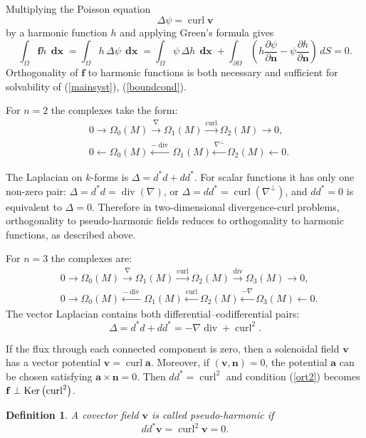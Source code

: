 \documentclass[a4paper]{article}
\newcommand{\Ker}{{\rm Ker}}
\newcommand{\bff}{\mathbf{f}}
\newcommand{\dx}{\operatorname{\mathbf{dx}}}
\newcommand{\ba}{\mathbf{a}}
\newcommand{\curl}{\operatorname{curl}}
\newcommand{\divv}{\operatorname{div}}
\newcommand{\bv}{\mathbf{v}}
\newcommand{\bn}{\mathbf{n}}
\newtheorem{definition}{Definition}[section]
\begin{document}
Multiplying the Poisson equation
$$
\Delta \psi = \curl \bv
$$
by a harmonic function $h$ and applying Green's formula gives
$$
\int _{\Omega } \bff h \,\dx = \int _{\Omega }h \,\Delta \psi \,\dx=\int _{\Omega }\psi\,\Delta h\,\dx+\int _{\partial \Omega }\left(h{\frac {\partial \psi}{\partial \bn }}-\psi{\frac {\partial h}{\partial \bn }}\right)\,dS = 0.
$$
Orthogonality of $\bff$ to harmonic functions is both necessary and sufficient for solvability of (\ref{mainsyst}), (\ref{boundcond}).

\vskip 0.5cm
For $n=2$ the complexes take the form:
\begin{align*}
&0 \xrightarrow {} \Omega_{0}(M)\xrightarrow {\nabla} \Omega_{1}(M)\xrightarrow {\curl} \Omega_{2}(M)\xrightarrow {} 0, \\
&0 \xleftarrow {} \Omega_{0}(M)\xleftarrow {-\divv} \Omega_{1}(M)\xleftarrow {\nabla^\perp} \Omega_{2}(M)\xleftarrow {} 0.
\end{align*}

The Laplacian on $k$-forms is $\Delta = d^*d + dd^*$. For scalar functions it has only one non-zero pair:
$\Delta = d^*d = \divv(\nabla)$, or $\Delta = dd^* = \curl(\nabla^\perp)$, and $dd^*=0$ is equivalent to $\Delta=0$.
Therefore in two-dimensional divergence-curl problems, orthogonality to pseudo-harmonic fields reduces to orthogonality to harmonic functions, as described above.

\vskip 0.5cm
For $n=3$ the complexes are:
\begin{align*}
&0 \xrightarrow {} \Omega_{0}(M)\xrightarrow {\nabla} \Omega_{1}(M)\xrightarrow {\curl} \Omega_{2}(M)\xrightarrow {\divv} \Omega_{3}(M)\xrightarrow {} 0,\\
&0 \xrightarrow {} \Omega_{0}(M)\xleftarrow {-\divv} \Omega_{1}(M)\xleftarrow {\curl} \Omega_{2}(M)\xleftarrow {-\nabla} \Omega_{3}(M)\xleftarrow {} 0.
\end{align*}
The vector Laplacian contains both differential--codifferential pairs:
$$\Delta = d^*d + dd^* = -\nabla \divv + \curl^2.$$

If the flux through each connected component is zero, then a solenoidal field $\bv$ has a vector potential $\bv = \curl \ba$. Moreover, if $(\bv, \bn)=0$, the potential $\ba$ can be chosen satisfying $\ba \times \bn = 0$. Then $dd^* = \curl^2$ and condition (\ref{ort2}) becomes $\bff \perp \Ker \left ( \curl^2 \right )$.

\begin{definition} A covector field $\bv$ is called \emph{pseudo-harmonic} if
$$dd^* \bv = \curl^2 \bv = 0.$$
\end{definition}
\end{document}
